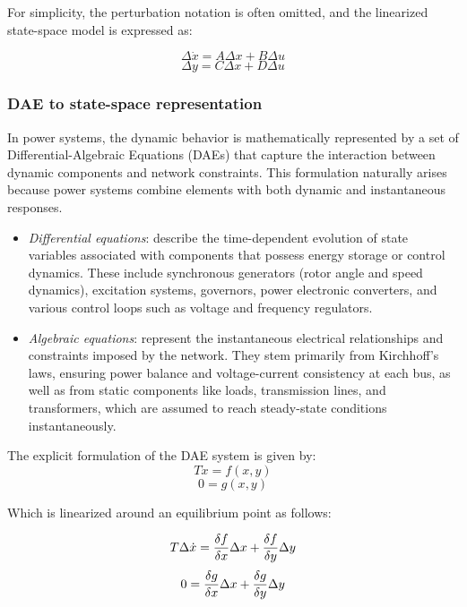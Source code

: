 For simplicity, the perturbation notation is often omitted, and the linearized state-space model is expressed as:
  
\begin{equation}
\Delta \dot{x} = A \Delta x + B \Delta u
\end{equation}
\begin{equation}
\Delta y = C \Delta x + D \Delta u
\end{equation}


\subsubsection{DAE to state-space representation}

In power systems, the dynamic behavior is mathematically represented by a set of Differential-Algebraic Equations (DAEs) 
that capture the interaction between dynamic components and network constraints. This formulation naturally arises because power systems
 combine elements with both dynamic and instantaneous responses.

\begin{itemize}
\item \textit{Differential equations}: describe the time-dependent evolution of state variables associated with components that possess energy storage
 or control dynamics. These include synchronous generators (rotor angle and speed dynamics), excitation systems, governors, power electronic converters,
  and various control loops such as voltage and frequency regulators.
\item \textit{Algebraic equations}: represent the instantaneous electrical relationships and constraints imposed by the network. They stem primarily from Kirchhoff's laws,
 ensuring power balance and voltage-current consistency at each bus, as well as from static components like loads, transmission lines, and transformers, which are assumed
  to reach steady-state conditions instantaneously.
\end{itemize}


The explicit formulation of the DAE system is given by:
\begin{equation}
    T \dot{x} = f(x, y)
\end{equation}
\begin{equation}
    0 = g(x, y)
\end{equation}

Which is linearized around an equilibrium point as follows:

\begin{equation}
    T \Delta \dot{x} =\frac{\delta f}{\delta x}\Delta x + \frac{\delta f}{\delta y}\Delta y\\
\end{equation}
\begin{equation}
    0 =\frac{\delta g}{\delta x}\Delta x + \frac{\delta g}{\delta y}\Delta y\\
\end{equation}

